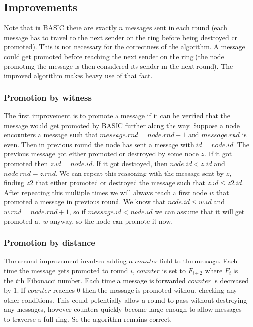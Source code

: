 \documentclass{article}
\begin{document}
\subsection*{Improvements}
Note that in BASIC there are exactly $n$ messages sent in each round (each message has to travel to the next sender on the ring before being destroyed or promoted). This is not necessary for the correctness of the algorithm. A message could get promoted before reaching the next sender on the ring (the node promoting the message is then considered its sender in the next round). The improved algorithm makes heavy use of that fact.

\subsubsection*{Promotion by witness}
The first improvement is to promote a message if it can be verified that the message would get promoted by BASIC further along the way. Suppose a node encounters a message such that $message.rnd = node.rnd + 1$ and $message.rnd$ is even. Then in previous round the node has sent a message with $id = node.id$. The previous message got either promoted or destroyed by some node $z$. If it got promoted then $z.id = node.id$. If it got destroyed, then $node.id < z.id$ and $node.rnd = z.rnd$. We can repeat this reasoning with the message sent by $z$, finding $z2$ that either promoted or destroyed the message such that $z.id \leq z2.id$. After repeating this multiple times we will always reach a first node $w$ that promoted a message in previous round. We know that $node.id \leq w.id$ and $w.rnd = node.rnd + 1$, so if $message.id < node.id$ we can assume that it will get promoted at $w$ anyway, so the node can promote it now.

\subsubsection*{Promotion by distance}
The second improvement involves adding a $counter$ field to the message. Each time the message gets promoted to round $i$, $counter$ is set to $F_{i+2}$ where $F_t$ is the $t$th Fibonacci number. Each time a message is forwarded $counter$ is decreased by 1. If $counter$ reaches 0 then the message is promoted without checking any other conditions. This could potentially allow a round to pass without destroying any messages, however counters quickly become large enough to allow messages to traverse a full ring. So the algorithm remains correct.
\end{document}
